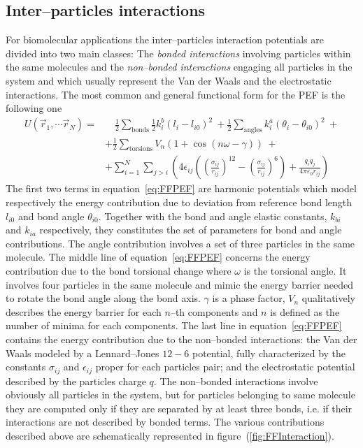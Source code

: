 \subsection{Inter--particles interactions}
For biomolecular applications the inter--particles interaction potentials are divided into two main classes: The \textit{bonded interactions} involving particles within the same molecules and the \textit{non--bonded interactions} engaging all particles in the system and which usually represent the Van der Waals and the electrostatic interactions. The most common and general functional form for the \ac{PEF} is the following one
\begin{equation}
	\begin{aligned}
		U(\vec r_1, \cdots \vec r_N) = &\quad \frac{1}{2}\sum_{\text{bonds}} \frac{1}{2}k_i^b(l_i - l_{i0})^2\ + \frac{1}{2}\sum_{\text{angles}} k_i^a (\theta_i - \theta_{i0})^2\ +\\
		&+ \frac{1}{2}\sum_{\text{torsions}} V_n(1+\cos (n\omega - \gamma))\ + \\
		&+ \sum_{i=1}^N \sum_{j>i} \left ( {4\epsilon_{ij} \left ( \left ( \frac{\sigma_{ij}}{r_{ij}} \right )^{12} - \left ( \frac{\sigma_{ij}}{r_{ij}} \right )^6 \right )  + \frac{q_iq_j}{4\pi\varepsilon_0 r_{ij}}} \right )
	\end{aligned}
	\label{eq:FFPEF}
\end{equation}
The first two terms in equation~\eqref{eq:FFPEF} are harmonic potentials which model respectively the energy contribution due to deviation from reference bond length $l_{i0}$ and bond angle $\theta_{i0}$. Together with the bond and angle elastic constants, $k_{bi}$ and $k_{ia}$ respectively, they constitutes the set of parameters for bond and angle contributions. The angle contribution involves a set of three particles in the same molecule.  The middle line of equation~\eqref{eq:FFPEF} concerns the energy contribution due to the bond torsional change where $\omega$ is the
torsional angle. It involves four particles in the same molecule and mimic the energy barrier needed to rotate the bond angle along the bond axis. $\gamma$ is a phase factor, $V_n$ qualitatively describes the energy barrier for each $n$--th components and $n$ is defined as the number of minima for each components. The last line in equation~\eqref{eq:FFPEF} contains the energy contribution due to the non--bonded interactions: the Van der Waals modeled by a Lennard--Jones $12-6$ potential, fully characterized by the constants $\sigma_{ij}$ and $\epsilon_{ij}$ proper for each particles pair; and the electrostatic potential described by the particles charge $q$. The non--bonded interactions involve obviously all particles in the system, but for particles belonging to same molecule they are computed only if they  are separated by at least three bonds, i.e. if their interactions are not described by bonded terms. The various contributions described above are schematically represented in figure~(\ref{fig:FFInteraction}).

